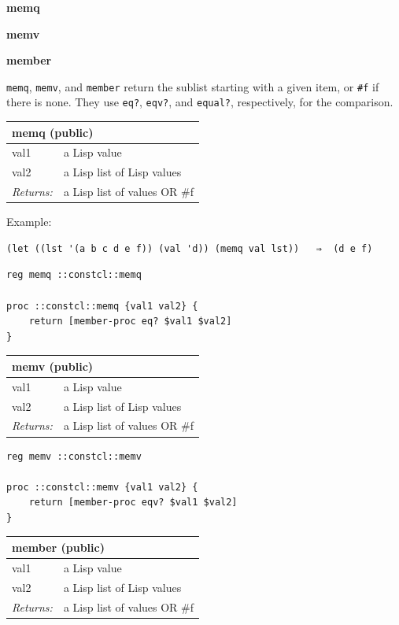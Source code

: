 \documentclass[twoside,9pt]{report}
\begin{document}
\textbf{memq}


\textbf{memv}


\textbf{member}


\texttt{memq}, \texttt{memv}, and \texttt{member} return the sublist starting with a given item, or \texttt{\#f} if there is none. They use \texttt{eq?}, \texttt{eqv?}, and \texttt{equal?}, respectively, for the comparison.

\begin{tabular}{ |l l| }
\hline
\multicolumn{2}{|l|}{memq (public)} \\
\hline
val1 & a Lisp value \\
val2 & a Lisp list of Lisp values \\
\textit{Returns:} & a Lisp list of values OR \#f \\
\hline
\end{tabular}


Example:

\noindent\makebox[\linewidth]{\rule{\linewidth}{0.4pt}}
\begin{lstlisting}
(let ((lst '(a b c d e f)) (val 'd)) (memq val lst))   ⇒  (d e f)
\end{lstlisting}
\noindent\makebox[\linewidth]{\rule{\linewidth}{0.4pt}}
\noindent\makebox[\linewidth]{\rule{\linewidth}{0.4pt}}
\begin{lstlisting}
reg memq ::constcl::memq
 
proc ::constcl::memq {val1 val2} {
    return [member-proc eq? $val1 $val2]
}
\end{lstlisting}
\noindent\makebox[\linewidth]{\rule{\linewidth}{0.4pt}}
\begin{tabular}{ |l l| }
\hline
\multicolumn{2}{|l|}{memv (public)} \\
\hline
val1 & a Lisp value \\
val2 & a Lisp list of Lisp values \\
\textit{Returns:} & a Lisp list of values OR \#f \\
\hline
\end{tabular}

\noindent\makebox[\linewidth]{\rule{\linewidth}{0.4pt}}
\begin{lstlisting}
reg memv ::constcl::memv
 
proc ::constcl::memv {val1 val2} {
    return [member-proc eqv? $val1 $val2]
}
\end{lstlisting}
\noindent\makebox[\linewidth]{\rule{\linewidth}{0.4pt}}
\begin{tabular}{ |l l| }
\hline
\multicolumn{2}{|l|}{member (public)} \\
\hline
val1 & a Lisp value \\
val2 & a Lisp list of Lisp values \\
\textit{Returns:} & a Lisp list of values OR \#f \\
\hline
\end{tabular}
\end{document}
